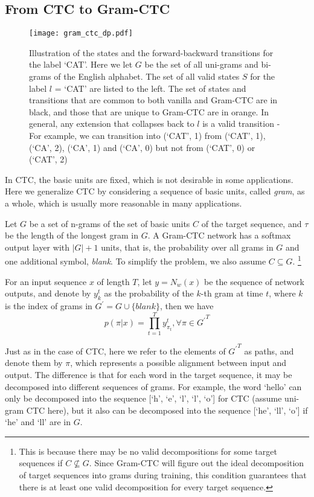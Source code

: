 \documentclass{article}
\begin{document}
\subsection{From CTC to Gram-CTC}
\vspace{-4pt}
\begin{figure*}[t]
\texttt{[image: gram\_ctc\_dp.pdf]}
\centering
\caption{Illustration of the states and the forward-backward transitions for the label `CAT'. Here we let $G$ be the set of all uni-grams and bi-grams of the English alphabet. The set of all valid states $S$ for the label $l$ = `CAT' are listed to the left. The set of states and transitions that are common to both vanilla and Gram-CTC are in black, and those that are unique to Gram-CTC are in orange. In general, any extension that collapses back to $l$ is a valid transition - For example, we can transition into (`CAT', 1) from  (`CAT', 1),  (`CA', 2),  (`CA', 1) and  (`CA', 0) but not from (`CAT', 0) or (`CAT', 2)}
\label{fig:dpgrams}
\end{figure*}
In CTC, the basic units are fixed, which is not desirable in some applications. Here we generalize CTC by considering a sequence of basic units, called \emph{gram}, as a whole, which is usually more reasonable in many applications.

Let $G$ be a set of n-grams of the set of basic units $C$ of the target sequence, and $\tau$ be the length of the longest gram in $G$. A Gram-CTC network has a softmax output layer with $|G|+1$ units, that is, the probability over all grams in $G$ and one additional symbol, \emph{blank}.
To simplify the problem, we also assume $C\subseteq G$. %
\footnote{This is because there may be no valid decompositions for some target sequences if $C\not \subseteq G$. Since Gram-CTC will figure out the ideal decomposition of target sequences into grams during training, this condition guarantees that there is at least one valid decomposition for every target sequence.}

For an input sequence $x$ of length $T$, let $y=N_{w}(x)$ be the sequence of network outputs, and denote by $y_k^t$ as the probability of the $k$-th gram at time $t$, where $k$ is the index of grams in $G^{\prime}=G\cup\{blank\}$,
then we have
\begin{equation}
p(\pi|x)=\prod_{t=1}^T y_{\pi_t}^t, \forall \pi\in {G^{\prime}}^T
\end{equation}

Just as in the case of CTC, here we refer to the elements of ${G^{\prime}}^T$ as paths, and denote them by $\pi$, which represents a possible alignment between input and output. The difference is that for each word in the target sequence, it may be decomposed into different sequences of grams. For example, the word `hello' can only be decomposed into the sequence [`h', `e', `l', `l', `o'] for CTC (assume uni-gram CTC here), but it also can be decomposed into the sequence [`he', `ll', `o'] if `he' and `ll' are in $G$.
\end{document}
